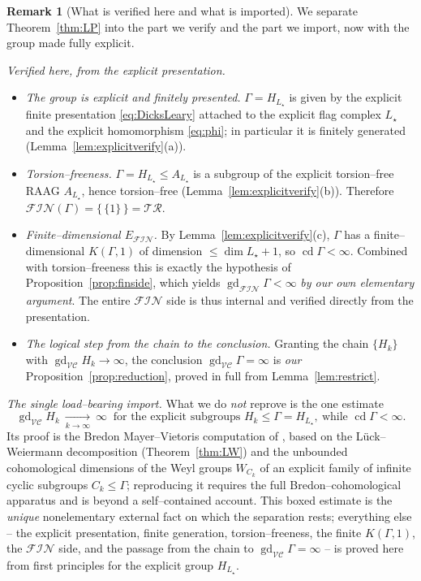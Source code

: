 \documentclass{amsart}
\theoremstyle{definition}
\newtheorem{remark}{Remark}
\newcommand{\FIN}{\mathcal{F\!I\!N}}
\newcommand{\VC}{\mathcal{V\!C}}
\newcommand{\gd}{\operatorname{gd}}
\newcommand{\cd}{\operatorname{cd}}
\begin{document}
\begin{remark}[What is verified here and what is imported]\label{rem:blackbox}
We separate Theorem~\ref{thm:LP} into the part we verify and the part we import, now with the
group made fully explicit.

\emph{Verified here, from the explicit presentation.}
\begin{itemize}
\item \emph{The group is explicit and finitely presented.} $\Gamma=H_{L_\star}$ is given by
the explicit finite presentation \eqref{eq:DicksLeary} attached to the explicit flag complex
$L_\star$ and the explicit homomorphism \eqref{eq:phi}; in particular it is finitely generated
(Lemma~\ref{lem:explicitverify}(a)).
\item \emph{Torsion--freeness.} $\Gamma=H_{L_\star}\le A_{L_\star}$ is a subgroup of the
explicit torsion--free RAAG $A_{L_\star}$, hence torsion--free
(Lemma~\ref{lem:explicitverify}(b)). Therefore $\FIN(\Gamma)=\{\,\{1\}\,\}=\mathcal{TR}$.
\item \emph{Finite--dimensional $E_{\FIN}$.} By
Lemma~\ref{lem:explicitverify}(c), $\Gamma$ has a finite--dimensional $K(\Gamma,1)$ of
dimension $\le\dim L_\star+1$, so $\cd\Gamma<\infty$. Combined with torsion--freeness this is exactly the
hypothesis of Proposition~\ref{prop:finside}, which yields $\gd_{\FIN}\Gamma<\infty$ \emph{by
our own elementary argument}. The entire $\FIN$ side is thus internal and verified directly
from the presentation.
\item \emph{The logical step from the chain to the conclusion.} Granting the chain $\{H_k\}$
with $\gd_{\VC}H_k\to\infty$, the conclusion $\gd_{\VC}\Gamma=\infty$ is \emph{our}
Proposition~\ref{prop:reduction}, proved in full from Lemma~\ref{lem:restrict}.
\end{itemize}

\emph{The single load--bearing import.} What we do \emph{not} reprove is the one estimate
\[
\boxed{\ \gd_{\VC}H_k\ \xrightarrow[k\to\infty]{}\ \infty\ \text{ for the explicit subgroups }
H_k\le \Gamma=H_{L_\star},\ \text{while } \cd\Gamma<\infty.\ }
\]
Its proof is the Bredon Mayer--Vietoris computation of \cite[\S\S2--5]{LearyPetrosyan}, based
on the Lück--Weiermann decomposition (Theorem~\ref{thm:LW}) and the unbounded cohomological
dimensions of the Weyl groups $W_{C_k}$ of an explicit family of infinite cyclic subgroups
$C_k\le\Gamma$; reproducing it requires the full Bredon--cohomological apparatus and is beyond
a self--contained account. This boxed estimate is the \emph{unique} nonelementary external
fact on which the separation rests; everything else -- the explicit presentation, finite
generation, torsion--freeness, the finite $K(\Gamma,1)$, the $\FIN$ side, and the passage from
the chain to $\gd_{\VC}\Gamma=\infty$ -- is proved here from first principles for the explicit
group $H_{L_\star}$.
\end{remark}
\end{document}
